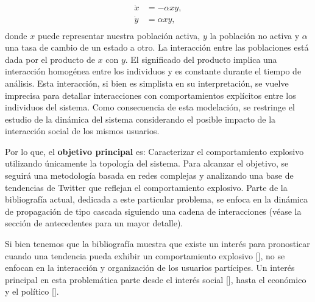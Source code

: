 \documentclass[../main.tex]{subfiles}
\begin{document}
\begin{align*}
    \Dot{x} &= -\alpha xy ,\\
    \Dot{y} &= \alpha xy ,\\
\end{align*}
donde $x$ puede representar nuestra población activa,  $y$ la población no activa y $\alpha$ una tasa de cambio de un estado a otro. La interacción entre las poblaciones está dada por el producto de $x$ con $y$. El significado del producto implica una interacción homogénea entre los individuos y es constante durante el tiempo de análisis. Esta interacción, si bien es simplista en su interpretación, se vuelve imprecisa para detallar interacciones con comportamientos explícitos entre los individuos del sistema. Como consecuencia de esta modelación, se restringe el estudio de la dinámica del sistema considerando el posible impacto de la interacción social de los mismos usuarios. 

Por lo que, el \textbf{objetivo principal} es: Caracterizar el comportamiento explosivo utilizando únicamente la topología del sistema. Para alcanzar el objetivo, se seguirá una metodología basada en redes complejas y analizando una base de tendencias de Twitter que reflejan el comportamiento explosivo. Parte de la bibliografía actual, dedicada a este particular problema, se enfoca en la dinámica de propagación de tipo cascada siguiendo una cadena de interacciones (véase la sección de antecedentes para un mayor detalle). 



Si bien tenemos que la bibliografía muestra que existe un interés para pronosticar cuando una tendencia pueda exhibir un comportamiento explosivo [\cite{Mathioudakis2010, Keeling2005}], no se  enfocan en la interacción y organización de los usuarios partícipes. Un interés principal en esta problemática parte desde el interés social [\cite{Barabsi2005}], hasta el económico y el político [\cite{Chen2021}].
\end{document}
